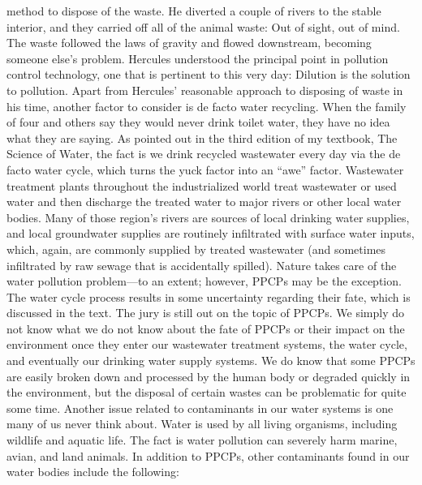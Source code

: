 \documentclass{article}
\begin{document}
method to dispose of the waste. He diverted a couple of rivers to the
stable interior, and they carried off all of the animal waste: Out of
sight, out of mind. The waste followed the laws of gravity and flowed
downstream, becoming someone else's problem. Hercules understood the
principal point in pollution control technology, one that is pertinent
to this very day: Dilution is the solution to pollution. Apart from
Hercules' reasonable approach to disposing of waste in his time, another
factor to consider is de facto water recycling. When the family of four
and others say they would never drink toilet water, they have no idea
what they are saying. As pointed out in the third edition of my
textbook, The Science of Water, the fact is we drink recycled wastewater
every day via the de facto water cycle, which turns the yuck factor into
an ``awe'' factor. Wastewater treatment plants throughout the
industrialized world treat wastewater or used water and then discharge
the treated water to major rivers or other local water bodies. Many of
those region's rivers are sources of local drinking water supplies, and
local groundwater supplies are routinely infiltrated with surface water
inputs, which, again, are commonly supplied by treated wastewater (and
sometimes infiltrated by raw sewage that is accidentally spilled).
Nature takes care of the water pollution problem---to an extent;
however, PPCPs may be the exception. The water cycle process results in
some uncertainty regarding their fate, which is discussed in the text.
The jury is still out on the topic of PPCPs. We simply do not know what
we do not know about the fate of PPCPs or their impact on the
environment once they enter our wastewater treatment systems, the water
cycle, and eventually our drinking water supply systems. We do know that
some PPCPs are easily broken down and processed by the human body or
degraded quickly in the environment, but the disposal of certain wastes
can be problematic for quite some time. Another issue related to
contaminants in our water systems is one many of us never think about.
Water is used by all living organisms, including wildlife and aquatic
life. The fact is water pollution can severely harm marine, avian, and
land animals. In addition to PPCPs, other contaminants found in our
water bodies include the following:
\end{document}

